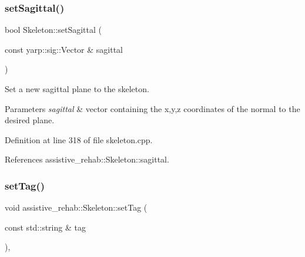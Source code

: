 \subsubsection{\texorpdfstring{setSagittal()}{setSagittal()}}
{\footnotesize\ttfamily bool Skeleton\+::set\+Sagittal (\begin{DoxyParamCaption}\item[{const yarp\+::sig\+::\+Vector \&}]{sagittal }\end{DoxyParamCaption})\hspace{0.3cm}{\ttfamily [inherited]}}



Set a new sagittal plane to the skeleton. 


\begin{DoxyParams}{Parameters}
{\em sagittal} & vector containing the x,y,z coordinates of the normal to the desired plane. \\
\hline
\end{DoxyParams}


Definition at line 318 of file skeleton.\+cpp.


\begin{DoxyCode}{0}

\end{DoxyCode}


References assistive\+\_\+rehab\+::\+Skeleton\+::sagittal.

\mbox{\label{classassistive__rehab_1_1Skeleton_ae1c830e3d9a0ba692e5ae297caa52a82}} 
\subsubsection{\texorpdfstring{setTag()}{setTag()}}
{\footnotesize\ttfamily void assistive\+\_\+rehab\+::\+Skeleton\+::set\+Tag (\begin{DoxyParamCaption}\item[{const std\+::string \&}]{tag }\end{DoxyParamCaption})\hspace{0.3cm}{\ttfamily [inline]}, {\ttfamily [inherited]}}



